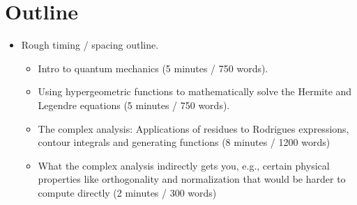 \documentclass[../finalProject.tex]{subfiles}
\begin{document}
\section*{Outline}
\begin{itemize}
    \item Rough timing / spacing outline.
    \begin{itemize}
        \item Intro to quantum mechanics (5 minutes / 750 words).
        \item Using hypergeometric functions to mathematically solve the Hermite and Legendre equations (5 minutes / 750 words).
        \item The complex analysis: Applications of residues to Rodrigues expressions, contour integrals and generating functions (8 minutes / 1200 words)
        \item What the complex analysis indirectly gets you, e.g., certain physical properties like orthogonality and normalization that would be harder to compute directly (2 minutes / 300 words)
    \end{itemize}
\end{itemize}
\end{document}
